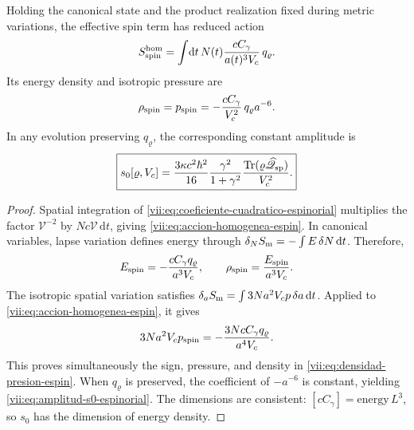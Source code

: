 \begin{theorem}
\label{vii:thm:amplitud-material-explicita}
Holding the canonical state and the product realization fixed
during metric variations, the effective spin term has reduced
action
\begin{equation}
 S_{\rm spin}^{\rm hom}
 =\int\!\mathrm dt\,N(t)
       \frac{cC_\gamma}{a(t)^3V_c}\,q_\varrho.
 \label{vii:eq:accion-homogenea-espin}
\end{equation}
Its energy density and isotropic pressure are
\begin{equation}
 \rho_{\rm spin}=p_{\rm spin}
 =-\frac{cC_\gamma}{V_c^2}\,q_\varrho a^{-6}.
 \label{vii:eq:densidad-presion-espin}
\end{equation}
In any evolution preserving \(q_\varrho\), the corresponding
constant amplitude is
\begin{equation}
 \boxed{\displaystyle
 s_0[\varrho,V_c]
 =\frac{3\kappa c^2\hbar^2}{16}
    \frac{\gamma^2}{1+\gamma^2}
    \frac{\operatorname{Tr}
       (\varrho\widehat{\mathscr Q}_{\rm sp})}{V_c^2}.}
 \label{vii:eq:amplitud-s0-espinorial}
\end{equation}
\end{theorem}
\begin{proof}
Spatial integration of
\eqref{vii:eq:coeficiente-cuadratico-espinorial} multiplies the
factor \(\mathcal V^{-2}\) by
\(Nc\mathcal V\,\mathrm dt\), giving
\eqref{vii:eq:accion-homogenea-espin}. In canonical variables,
lapse variation defines energy through
\(\delta_N S_{\rm m}=-\int E\,\delta N\,\mathrm dt\).
Therefore,
\[
 E_{\rm spin}=-\frac{cC_\gamma q_\varrho}{a^3V_c},
 \qquad \rho_{\rm spin}=\frac{E_{\rm spin}}{a^3V_c}.
\]
The isotropic spatial variation satisfies
\(\delta_a S_{\rm m}=\int3Na^2V_c p\,\delta a\,\mathrm dt\).
Applied to \eqref{vii:eq:accion-homogenea-espin}, it gives
\[
 3Na^2V_c p_{\rm spin}
 =-\frac{3NcC_\gamma q_\varrho}{a^4V_c}.
\]
This proves simultaneously the sign, pressure, and density in
\eqref{vii:eq:densidad-presion-espin}. When
\(q_\varrho\) is preserved, the coefficient of \(-a^{-6}\) is constant,
yielding \eqref{vii:eq:amplitud-s0-espinorial}. The dimensions
are consistent: \([cC_\gamma]=\mathrm{energy}\,L^3\),
so \(s_0\) has the dimension of energy density.
\end{proof}

